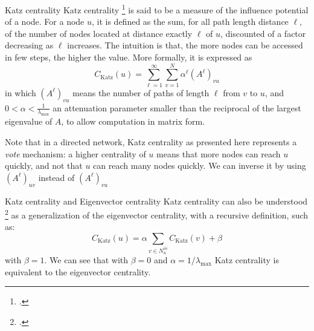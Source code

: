 \documentclass[a4paper,11pt]{book}
\begin{document}
\begin{textbox}{Katz centrality}
Katz centrality \footcite{katz1953new} is said to be a measure of the influence potential of a node. For a node $u$, it is defined as the sum, for all path length distance $\ell$, of the number of nodes located at distance exactly $\ell$ of $u$, discounted of a factor decreasing as $\ell$ increases. The intuition is that, the more nodes can be accessed in few steps, the higher the value. More formally, it is expressed as
\[
 C_{\mathrm {Katz} }(u)=\sum _{\ell=1}^{\infty }\sum _{v=1}^{N}\alpha ^{\ell}(A^{\ell})_{vu}
\]
in which $(A^{\ell})_{vu}$ means the number of paths of length $\ell$ from $v$ to $u$, and $0< \alpha < \frac{1}{\lambda_{\max}}$ an attenuation parameter smaller than the reciprocal of the largest eigenvalue of $A$, to allow computation in matrix form.

\vspace{0.25cm}

Note that in a directed network, Katz centrality as presented here represents a \textit{vote} mechanism: a higher centrality of $u$ means that more nodes can reach $u$ quickly, and not that $u$ can reach many nodes quickly. We can inverse it by using $(A^{\ell})_{uv}$ instead of $(A^{\ell})_{vu}$
\end{textbox}


\begin{textbox}{Katz centrality and Eigenvector centrality}
Katz centrality can also be understood \footcite{newman2018networks} as a generalization of the eigenvector centrality, with a recursive definition, such as:
\[
C_{\mathrm {Katz} }(u) = \alpha \sum_{v\in N^{in}_u} C_{\mathrm {Katz} }(v) + \beta
\]
with $\beta=1$. We can see that with $\beta=0$ and $\alpha = 1/\lambda_{\max}$ Katz centrality is equivalent to the eigenvector centrality.

\end{textbox}
\end{document}
